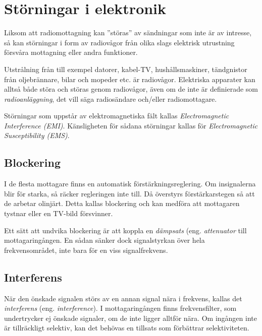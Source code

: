 \newpage
\section{Störningar i elektronik}

Liksom att radiomottagning kan ''störas'' av sändningar som inte är av
intresse, så kan störningar i form av radiovågor från olika slags
elektrisk utrustning försvåra mottagning eller andra funktioner.

Utstrålning från till exempel datorer, kabel-TV, hushållsmaskiner,
tändgnistor från oljebrännare, bilar och mopeder etc. är radiovågor.
Elektriska apparater kan alltså både störa och störas genom
radiovågor, även om de inte är definierade som \emph{radioanläggning},
det vill säga radiosändare och/eller radiomottagare.

Störningar som uppstår av elektromagnetiska fält kallas
\emph{Electromagnetic Interference (EMI)}.
Känsligheten för sådana störningar kallas för
\emph{Electromagnetic Susceptibility (EMS)}.

\subsection{Blockering}
\label{blockering}

I de flesta mottagare finns en automatisk förstärkningsreglering.
Om insignalerna blir för starka, så räcker regleringen inte till.
Då överstyrs förstärkarstegen så att de arbetar olinjärt.
Detta kallas blockering och kan medföra att mottagaren tystnar eller en TV-bild
försvinner.

Ett sätt att undvika blockering är att koppla en \emph{dämpsats}
(eng. \emph{attenuator} till mottagaringången.
En sådan sänker dock signalstyrkan över hela frekvensområdet, inte bara för en
viss signalfrekvens.

\subsection{Interferens}

När den önskade signalen störs av en annan signal nära i frekvens, kallas det
\emph{interferens} (eng. \emph{interference}).
I mottagaringången finns frekvensfilter, som undertrycker ej önskade signaler,
om de inte ligger alltför nära.
Om ingången inte är tillräckligt selektiv, kan det behövas en tillsats som
förbättrar selektiviteten.

